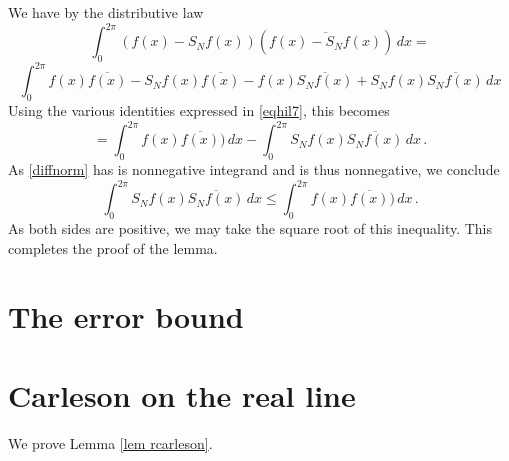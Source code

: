 We have by the distributive law
\begin{equation}\label{diffnorm}
    \int_0^{2\pi} (f(x)-S_Nf(x))(\overline{f(x)-S_Nf(x)})\, dx=
\end{equation}
\begin{equation*}
    \int_0^{2\pi} f(x)\overline{f(x)}
    -S_Nf(x)\overline{f(x)}
    -f(x)\overline{S_Nf(x)}
        + S_Nf(x)\overline{S_Nf(x)}\, dx
\end{equation*}
Using the various identities expressed in \eqref{eqhil7}, this becomes
\begin{equation}
    =\int_0^{2\pi} f(x)\overline{f(x)})\, dx
    -
    \int_0^{2\pi} S_Nf(x)\overline{S_Nf(x)}\, dx\, .
\end{equation}
As \eqref{diffnorm} has is nonnegative integrand and is thus nonnegative, we conclude
\begin{equation}
    \int_0^{2\pi} S_Nf(x)\overline{S_Nf(x)}\, dx\le
    \int_0^{2\pi} f(x)\overline{f(x)})\, dx\, .
\end{equation}
As both sides are positive, we may take the square root of this inequality.
This completes the proof of the lemma.














\section{The error bound}
\label{10difference}

\section{Carleson on the real line}
\label{10carleson}

We prove Lemma \ref{lem rcarleson}.

